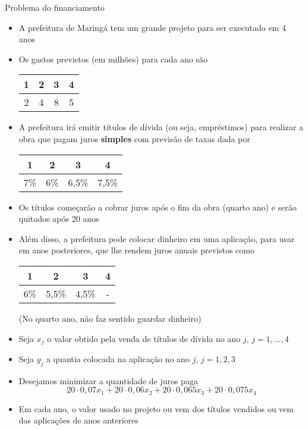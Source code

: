 \documentclass[10pt]{beamer}
\begin{document}
\begin{frame}{Problema do financiamento}

  \begin{itemize}
  \item<only@1> A prefeitura de Maringá tem um grande projeto para ser
    executado em 4 anos
  \item<only@1> Os gastos previstos (em milhões) para cada ano são
    \begin{center}
      \begin{tabular}{cccc}
        1 & 2 & 3 & 4 \\\hline
        2 & 4 & 8 & 5
      \end{tabular}
    \end{center}
  \item<only@2> A prefeitura irá emitir títulos de dívida (ou seja,
    empréstimos) para realizar a obra que pagam juros
    \textbf{simples} com \alert{previsão de taxas} dada por
    \begin{center}
      \begin{tabular}{cccc}
        1 & 2 & 3 & 4 \\\hline
        7\% & 6\% & 6,5\% & 7,5\%
      \end{tabular}
    \end{center}
  \item<only@2> Os títulos começarão a cobrar juros \alert{após} o fim
    da obra (quarto ano) e serão quitados após 20 anos

  \item<only@3> Além disso, a prefeitura pode colocar dinheiro em uma
    \alert{aplicação}, para usar em anos posteriores, que lhe rendem
    juros anuais previstos como
    \begin{center}
      \begin{tabular}{cccc}
        1 & 2 & 3 & 4 \\\hline
        6\% & 5,5\% & 4,5\% & -
      \end{tabular}
    \end{center}
    (No quarto ano, não faz sentido guardar dinheiro)

  \item<only@4> Seja $x_j$ o valor obtido pela venda de títulos de
    dívida no ano $j$, $j = 1, \dots, 4$
  \item<only@4> Seja $y_j$ a quantia colocada na aplicação no ano $j$,
    $j = 1, 2, 3$

  \item<only@5> Desejamos minimizar a quantidade de juros paga
    \[
      20 \cdot 0,07 x_1 + 20 \cdot 0,06 x_2 + 20 \cdot 0,065 x_3 + 20
      \cdot 0,075 x_4
    \]
  \item<only@6> Em cada ano, o valor usado no projeto ou vem dos
    títulos vendidos ou vem das aplicações de anos anteriores


\end{itemize}
\end{frame}
\end{document}
